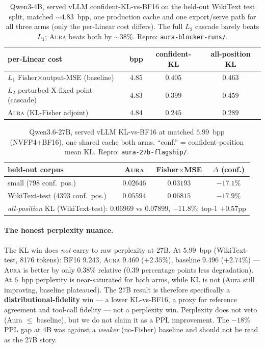 \documentclass[11pt]{article}
\theoremstyle{plain}
\theoremstyle{definition}
\begin{document}
\begin{table}[t]\centering
\small
\caption{Qwen3-4B, served vLLM confident-KL-vs-BF16 on the held-out WikiText test
split, matched $\sim\!4.83$~bpp, one production cache and one export/serve path for
all three arms (only the per-Linear cost differs). The full $L_2$ cascade barely
beats $L_1$; \textsc{Aura} beats both by $\sim\!38\%$. Repro: \texttt{aura-blocker-runs/}.}
\label{tab:cascade}
\begin{tabular}{lccc}
\toprule
per-Linear cost & bpp & confident-KL & all-position KL \\
\midrule
$L_1$ Fisher$\times$output-MSE (baseline) & $4.85$ & $0.405$ & $0.463$ \\
$L_2$ perturbed-X fixed point (cascade)   & $4.83$ & $0.399$ & $0.459$ \\
\textsc{Aura} (KL-Fisher adjoint)         & $4.84$ & $\mathbf{0.245}$ & $\mathbf{0.289}$ \\
\bottomrule
\end{tabular}
\end{table}

\begin{table}[t]\centering
\small
\caption{Qwen3.6-27B, served vLLM KL-vs-BF16 at matched $5.99$~bpp (NVFP4+BF16),
one shared cache both arms. ``conf.'' = confident-position mean KL.
Repro: \texttt{aura-27b-flagship/}.}
\label{tab:27b}
\begin{tabular}{lccc}
\toprule
held-out corpus & \textsc{Aura} & Fisher$\times$MSE & $\Delta$ (conf.) \\
\midrule
small (798 conf.\ pos.)            & $0.02646$ & $0.03193$ & $-17.1\%$ \\
WikiText-test (4393 conf.\ pos.)   & $0.05594$ & $0.06815$ & $-17.9\%$ \\
\midrule
\multicolumn{4}{l}{\emph{all-position} KL (WikiText-test): $0.06969$ vs $0.07899$, $-11.8\%$; top-1 $+0.57$pp}\\
\bottomrule
\end{tabular}
\end{table}

\paragraph{The honest perplexity nuance.} The KL win does \emph{not} carry to raw
perplexity at 27B. At $5.99$~bpp (WikiText-test, 8176 tokens): BF16 $9.243$,
\textsc{Aura} $9.460$ ($+2.35\%$), baseline $9.496$ ($+2.74\%$) --- \textsc{Aura}
is better by only $0.38\%$ relative ($0.39$ percentage points less degradation).
At $6$~bpp perplexity is near-saturated for both arms, while KL is not (Aura still
improving, baseline plateaued). The 27B result is therefore specifically a
\textbf{distributional-fidelity} win --- a lower KL-vs-BF16, a proxy for reference
agreement and tool-call fidelity --- not a
perplexity win. Perplexity does not veto (Aura $\le$ baseline), but we do
not claim it as a PPL improvement. The $-18\%$ PPL gap at 4B was against a
\emph{weaker} (no-Fisher) baseline and should not be read as the 27B story.
\end{document}
